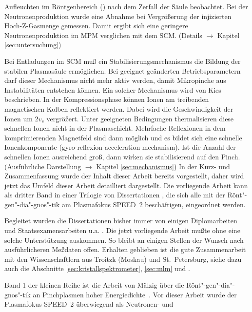 Aufleuchten im Röntgenbereich () nach dem
Zerfall der Säule beobachtet. Bei der Neutronenproduktion wurde eine
Abnahme bei Vergrößerung der injizierten Hoch-Z-Gasmenge gemessen.
Damit ergibt sich eine geringere Neutronenproduktion im MPM verglichen
mit dem SCM. (Details $\rightarrow$ Kapitel \vref{sec:untersuchung})
\par
Bei Entladungen im SCM muß ein Stabilisierungsmechanismus die Bildung
der stabilen Plasmasäule ermöglichen. Bei geeignet geänderten
Betriebsparametern darf dieser Mechanismus nicht mehr aktiv werden,
damit Mikropinche aus Instabilitäten entstehen können. Ein solcher
Mechanismus wird von Kies \cite{kies:99} beschrieben. In der
Kompressionsphase können Ionen am treibenden magnetischen Kolben
reflektiert werden. Dabei wird die Geschwindigkeit der Ionen um $2 v_s$
vergrößert. Unter geeigneten Bedingungen thermalisieren diese schnellen
Ionen nicht in der Plasmaschicht. Mehrfache Reflexionen in dem
komprimierenden Magnetfeld sind dann möglich und es bildet sich eine
schnelle Ionenkomponente (\glqq gyro-reflexion acceleration
mechanism\grqq ). Ist die Anzahl der schnellen Ionen ausreichend groß,
dann wirken sie stabilisierend auf den Pinch. (Ausführliche Darstellung
$\rightarrow$ Kapitel \vref{sec:mechanismus})
%
%
\label{sec:einleitung}
%
In der Kurz- und Zusammenfassung wurde der Inhalt dieser Arbeit
bereits vorgestellt, daher wird jetzt das Umfeld dieser Arbeit
detailliert dargestellt. Die vorliegende Arbeit kann als dritter
Band in einer Trilogie von Dissertationen
\cite{maelzig:phd,roewe:phd}, die sich alle mit der
Rönt"-gen"-dia"-gnos"-tik am Plasmafokus SPEED~2 beschäftigen,
eingeordnet werden.
\par
Begleitet wurden die Dissertationen bisher immer von einigen
Diplomarbeiten und Staatsexamensarbeiten u.a.
\cite{doll:diplom,stein:staat,roewe:diplom,schmitz:diplom,
nadolny:diplom,lucas:diplom,soll:diplom}. Die jetzt vorliegende Arbeit
mußte ohne eine solche Unterstützung auskommen. So bleibt an einigen
Stellen der Wunsch nach ausführlicheren Meßdaten offen. Erhalten
geblieben ist die gute Zusammenarbeit mit den Wissenschaftlern aus
Troitzk (Moskau) und St.~Petersburg, siehe dazu auch die Abschnitte
\ref{sec:kristallspektrometer}, \ref{sec:mlm} und \cite{bobashev:97}.
\par
Band 1 der kleinen Reihe ist die Arbeit von Mälzig über die \glqq
Rönt"-gen"-dia"-gnos"-tik an Pinchplasmen hoher
Energiedichte\grqq\ \cite{maelzig:phd}. Vor dieser Arbeit wurde
der Plasmafokus SPEED~2 überwiegend als Neutronen- und
